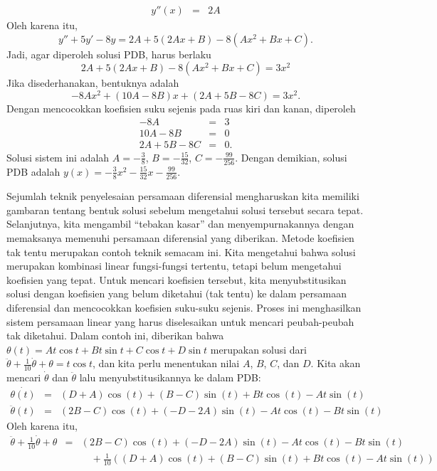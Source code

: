 \begin{description}
\begin{eqnarray*}
y''(x) & = & 2A
\end{eqnarray*}
Oleh karena itu,
\[
y''+5y'-8y=2A+5(2Ax+B)-8(Ax^{2}+Bx+C).
\]
Jadi, agar diperoleh solusi PDB, harus berlaku 
\[
2A+5(2Ax+B)-8(Ax^{2}+Bx+C)=3x^{2}
\]
Jika disederhanakan, bentuknya adalah
\[
-8Ax^{2}+(10A-8B)x+(2A+5B-8C)=3x^{2}.
\]
Dengan mencocokkan koefisien suku sejenis pada ruas kiri dan kanan,
diperoleh
\begin{eqnarray*}
-8A & = & 3\\
10A-8B & = & 0\\
2A+5B-8C & = & 0.
\end{eqnarray*}
Solusi sistem ini adalah $A=-\frac{3}{8}$, $B=-\frac{15}{32}$, $C=-\frac{99}{256}$.
Dengan demikian, solusi PDB adalah $y(x)=-\frac{3}{8}x^{2}-\frac{15}{32}x-\frac{99}{256}$.
\item [{\ref{exc:ode-taylor-18}:}] Sejumlah teknik penyelesaian persamaan
diferensial mengharuskan kita memiliki gambaran tentang bentuk solusi
sebelum mengetahui solusi tersebut secara tepat. Selanjutnya, kita
mengambil ``tebakan kasar'' dan menyempurnakannya dengan memaksanya
memenuhi persamaan diferensial yang diberikan. Metode koefisien tak
tentu merupakan contoh teknik semacam ini. Kita mengetahui bahwa solusi
merupakan kombinasi linear fungsi-fungsi tertentu, tetapi belum mengetahui
koefisien yang tepat. Untuk mencari koefisien tersebut, kita menyubstitusikan
solusi dengan koefisien yang belum diketahui (tak tentu) ke dalam
persamaan diferensial dan mencocokkan koefisien suku-suku sejenis.
Proses ini menghasilkan sistem persamaan linear yang harus diselesaikan
untuk mencari peubah-peubah tak diketahui. Dalam contoh ini, diberikan
bahwa $\theta(t)=At\cos t+Bt\sin t+C\cos t+D\sin t$ merupakan solusi
dari $\ddot{\theta}+\frac{1}{10}\dot{\theta}+\theta=t\cos t$, dan
kita perlu menentukan nilai $A$, $B$, $C$, dan $D$. Kita akan
mencari $\dot{\theta}$ dan $\ddot{\theta}$ lalu menyubstitusikannya
ke dalam PDB:
\begin{eqnarray*}
\dot{\theta(t)} & = & (D+A)\cos(t)+(B-C)\sin(t)+Bt\cos(t)-At\sin(t)\\
\ddot{\theta}(t) & = & (2B-C)\cos(t)+(-D-2A)\sin(t)-At\cos(t)-Bt\sin(t)
\end{eqnarray*}
Oleh karena itu,
\begin{eqnarray*}
\ddot{\theta}+\frac{1}{10}\dot{\theta}+\theta & = & (2B-C)\cos(t)+(-D-2A)\sin(t)-At\cos(t)-Bt\sin(t)\\
 &  & \quad+\frac{1}{10}\left((D+A)\cos(t)+(B-C)\sin(t)+Bt\cos(t)-At\sin(t)\right)\\

\end{eqnarray*}
\end{description}
